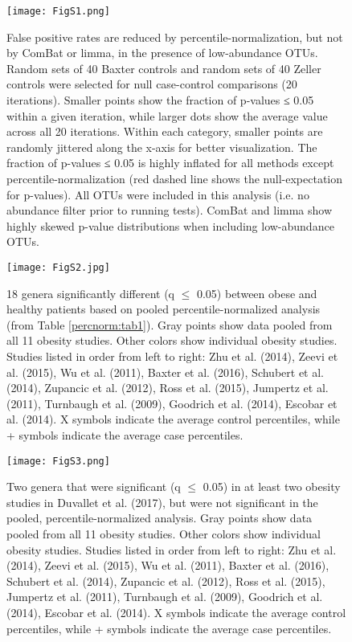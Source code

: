 \begin{figure}[h]
\begin{center}
    \texttt{[image: FigS1.png]}
    \caption{False positive rates are reduced by percentile-normalization, but not by ComBat or limma, in the presence of low-abundance OTUs. Random sets of 40 Baxter controls and random sets of 40 Zeller controls were selected for null case-control comparisons (20 iterations). Smaller points show the fraction of p-values ≤ 0.05 within a given iteration, while larger dots show the average value across all 20 iterations. Within each category, smaller points are randomly jittered along the x-axis for better visualization. The fraction of p-values ≤ 0.05 is highly inflated for all methods except percentile-normalization (red dashed line shows the null-expectation for p-values). All OTUs were included in this analysis (i.e. no abundance filter prior to running tests). ComBat and limma show highly skewed p-value distributions when including low-abundance OTUs.}\label{percnorm:figS1}
\end{center}
\end{figure}

\begin{figure}[h]
\begin{center}
    \texttt{[image: FigS2.jpg]}
    \caption{18 genera significantly different (q $\leq$ 0.05) between obese and healthy patients based on pooled percentile-normalized analysis (from Table \ref{percnorm:tab1}). Gray points show data pooled from all 11 obesity studies. Other colors show individual obesity studies. Studies listed in order from left to right: Zhu et al. (2014), Zeevi et al. (2015), Wu et al. (2011), Baxter et al. (2016), Schubert et al. (2014), Zupancic et al. (2012), Ross et al. (2015), Jumpertz et al. (2011), Turnbaugh et al. (2009), Goodrich et al. (2014), Escobar et al. (2014). X symbols indicate the average control percentiles, while + symbols indicate the average case percentiles.}\label{percnorm:figS2}
\end{center}
\end{figure}

\begin{figure}[h]
\begin{center}
    \texttt{[image: FigS3.png]}
    \caption{Two genera that were significant (q $\leq$ 0.05) in at least two obesity studies in Duvallet et al. (2017), but were not significant in the pooled, percentile-normalized analysis. Gray points show data pooled from all 11 obesity studies. Other colors show individual obesity studies. Studies listed in order from left to right: Zhu et al. (2014), Zeevi et al. (2015), Wu et al. (2011), Baxter et al. (2016), Schubert et al. (2014), Zupancic et al. (2012), Ross et al. (2015), Jumpertz et al. (2011), Turnbaugh et al. (2009), Goodrich et al. (2014), Escobar et al. (2014). X symbols indicate the average control percentiles, while + symbols indicate the average case percentiles.}\label{percnorm:figS3}
\end{center}
\end{figure}

\begin{singlespace}


\end{singlespace}
